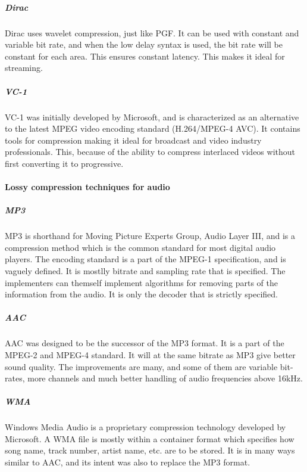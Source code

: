 \subparagraph{Dirac} \hfill
\newline
Dirac uses wavelet compression, just like PGF. It can be used with constant and variable bit rate, and when the low delay syntax is used, the bit rate will be constant for each area. This ensures constant latency. This makes it ideal for streaming.
\cite{bib:Dirac}


\subparagraph{VC-1} \hfill
\newline
VC-1 was initially developed by Microsoft, and is characterized as an alternative to the latest MPEG video encoding standard (H.264/MPEG-4 AVC). It contains tools for compression making it ideal for broadcast and video industry professionals. This, because of the ability to compress interlaced videos without first converting it to progressive.
\cite{bib:VC-1}


\paragraph{Lossy compression techniques for audio}


\subparagraph{MP3} \hfill
\newline
MP3 is shorthand for Moving Picture Experts Group, Audio Layer III, and is a compression method which is the common standard for most digital audio players. The encoding standard is a part of the MPEG-1 specification, and is vaguely defined. It is mostlly bitrate and sampling rate that is specified. The implementers can themself implement algorithms for removing parts of the information from the audio. It is only the decoder that is strictly specified.
\cite{bib:MP3}


\subparagraph{AAC}\hfill
\newline
AAC was designed to be the successor of the MP3 format. It is a part of the MPEG-2 and MPEG-4 standard. It will at the same bitrate as MP3 give better sound quality. The improvements are many, and some of them are variable bit-rates, more channels  and much better handling of audio frequencies above 16kHz.
\cite{bib:AAC}


\subparagraph{WMA} \hfill
\newline
Windows Media Audio is a proprietary compression technology developed by Microsoft. A WMA file is mostly within a container format which specifies how song name, track number, artist name, etc. are to be stored. It is in many ways similar to AAC, and its intent was also to replace the MP3 format.
\cite{bib:WMA}

\pagebreak

